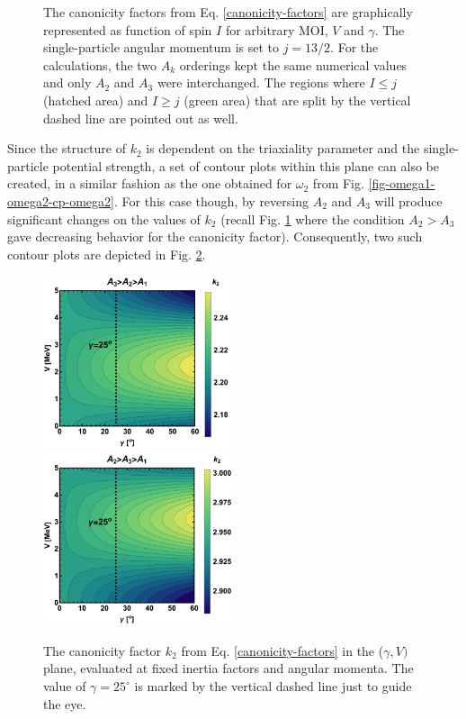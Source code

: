\begin{figure}
    \caption{The canonicity factors from Eq. \ref{canonicity-factors} are graphically represented as function of spin $I$ for arbitrary MOI, $V$ and $\gamma$. The single-particle angular momentum is set to $j=13/2$. For the calculations, the two $A_k$ orderings kept the same numerical values and only $A_2$ and $A_3$ were interchanged. The regions where $I\leq j$ (hatched area) and $I\geq j$ (green area) that are split by the vertical dashed line are pointed out as well.}
    \label{fig-k-1-2-factors}
\end{figure}

Since the structure of $k_2$ is dependent on the triaxiality parameter and the single-particle potential strength, a set of contour plots within this plane can also be created, in a similar fashion as the one obtained for $\omega_2$ from Fig. \ref{fig-omega1-omega2-cp-omega2}. For this case though, by reversing $A_2$ and $A_3$ will produce significant changes on the values of $k_2$ (recall Fig. \ref{fig-k-1-2-factors} where the condition $A_2>A_3$ gave decreasing behavior for the canonicity factor). Consequently, two such contour plots are depicted in Fig. \ref{fig-k2-factor-contour}.
\begin{figure}
    \centering
    \includegraphics[width=0.49\textwidth]{Chapters/Figures/k2_CP.pdf}
    \includegraphics[width=0.5\textwidth]{Chapters/Figures/k2_reversed_CP.pdf}
    \caption{The canonicity factor $k_2$ from Eq. \ref{canonicity-factors} in the ($\gamma,V)$ plane, evaluated at fixed inertia factors and angular momenta. The value of $\gamma=25^\circ$ is marked by the vertical dashed line just to guide the eye.}
    \label{fig-k2-factor-contour}
\end{figure}

